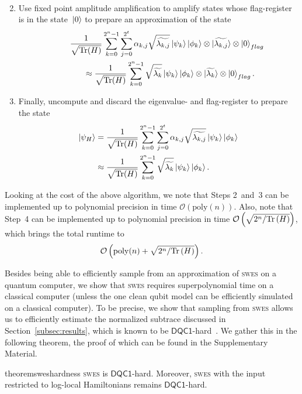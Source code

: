 \documentclass[a4paper, onecolumn, accepted=2022-08-28]{quantumarticle}
\newcommand{\bigO}[1]{\mathcal{O}\left( #1 \right)}
\newcommand{\Tr}{\mbox{\rm Tr}}
\newcommand{\tr}[1]{\Tr\left(#1\right)}
\begin{document}
\begin{enumerate}
\begin{align*}
  \end{align*}
\item Use fixed point amplitude amplification to amplify states whose flag-register is in the state~$\ket{0}$ to prepare an approximation of the state
  \begin{align*}
    \qquad\frac{1}{\sqrt{\Tr(H)}}&\sum_{k = 0}^{2^n-1}\sum_{j = 0}^{2^t}\alpha_{k,j}\sqrt{\widetilde{\lambda_{k,j}}}\ket{\psi_k}\ket{\phi_k}\otimes \ket{\widetilde{\lambda_{k,j}}} \otimes \ket{0}_{flag}\\
    &\hspace{-23pt}\approx \frac{1}{\sqrt{\Tr(H)}}\sum_{k = 0}^{2^n-1}\sqrt{\widetilde{\lambda_{k}}}\ket{\psi_k}\ket{\phi_k}\otimes \ket{\widetilde{\lambda_{k}}} \otimes \ket{0}_{flag}.
  \end{align*}
  \item Finally, uncompute and discard the eigenvalue- and flag-register to prepare the state
  \begin{align*}
    \ket{\psi_H} &= \frac{1}{\sqrt{\Tr(H)}}\sum_{k = 0}^{2^n-1}\sum_{j = 0}^{2^t}\alpha_{k,j}\sqrt{\widetilde{\lambda_{k,j}}}\ket{\psi_k}\ket{\phi_k} \\
    &\approx \frac{1}{\sqrt{\Tr(H)}}\sum_{k = 0}^{2^n-1}\sqrt{\widetilde{\lambda_{k}}}\ket{\psi_k}\ket{\phi_k}.
  \end{align*}
\end{enumerate}
Looking at the cost of the above algorithm, we note that Steps 2~and~3 can be implemented up to polynomial precision in time $\bigO{\mathrm{poly}(n)}$.
Also, note that Step~4 can be implemented up to polynomial precision in time $\bigO{\sqrt{2^n/\tr{H}}}$, which brings the total runtime to
\[
\bigO{\mathrm{poly}(n) + \sqrt{2^n/\tr{H}}}.
\]

Besides being able to efficiently sample from an approximation of \textsc{swes} on a quantum computer, we show that \textsc{swes} requires superpolynomial time on a classical computer (unless the one clean qubit model can be efficiently simulated on a classical computer). 
To be precise, we show that sampling from \textsc{swes} allows us to efficiently estimate the normalized subtrace discussed in Section~\ref{subsec:results}, which is known to be $\mathsf{DQC1}$-hard~\cite{brandao:thesis}.
We gather this in the following theorem, the proof of which can be found in the Supplementary Material.
\begin{restatable}{theorem}{sweshardness}
  \textsc{swes} is $\mathsf{DQC1}$-hard.
  Moreover, \textsc{swes} with the input restricted to log-local Hamiltonians remains $\mathsf{DQC1}$-hard.
 \label{thm:dqc1_hardness_swes}
\end{restatable}
\end{document}
